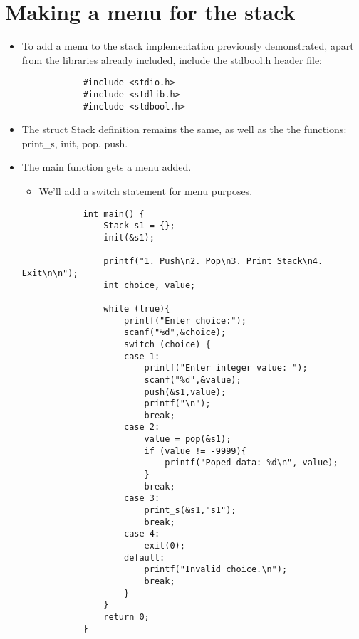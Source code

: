 \section{Making a menu for the stack}
\begin{itemize}
    \item To add a menu to the stack implementation previously demonstrated, apart from the libraries already included, include the stdbool.h header file:
        \begin{verbatim}
            #include <stdio.h>
            #include <stdlib.h>
            #include <stdbool.h>
        \end{verbatim}
    
    \item The struct Stack definition remains the same, as well as the the functions: print\_s, init, pop, push.
    \item The main function gets a menu added.
        \begin{itemize}
            \item We'll add a switch statement for menu purposes.
        \end{itemize}
        \begin{verbatim}
            int main() {
                Stack s1 = {}; 
                init(&s1);

                printf("1. Push\n2. Pop\n3. Print Stack\n4. Exit\n\n");
                int choice, value; 

                while (true){
                    printf("Enter choice:");
                    scanf("%d",&choice);
                    switch (choice) {
                    case 1:
                        printf("Enter integer value: ");
                        scanf("%d",&value);
                        push(&s1,value);
                        printf("\n");
                        break;
                    case 2:
                        value = pop(&s1);
                        if (value != -9999){
                            printf("Poped data: %d\n", value);
                        }
                        break; 
                    case 3:
                        print_s(&s1,"s1");
                        break; 
                    case 4: 
                        exit(0);
                    default:
                        printf("Invalid choice.\n");
                        break;
                    }
                }
                return 0;
            }
        \end{verbatim}
    

\end{itemize}
